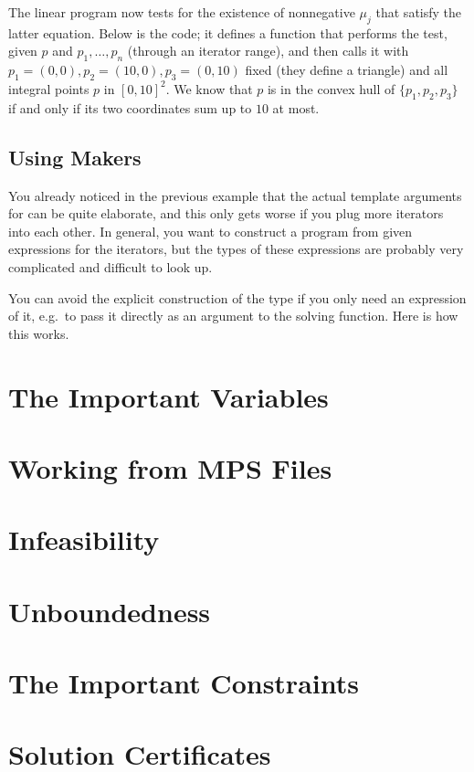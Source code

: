 The linear program now tests for the existence of nonnegative $\mu_j$
that satisfy the latter equation. Below is the code; it defines a function
that performs the test, given $p$ and $p_1,\ldots,p_n$ (through an iterator
range), and then calls it with $p_1=(0,0), p_2=(10,0), p_3=(0,10)$ fixed 
(they define a triangle) and all integral points $p$ in $[0,10]^2$. We know
that $p$ is in the convex hull of $\{p_1,p_2,p_3\}$ if and only if its two
coordinates sum up to $10$ at most.


\subsection{Using Makers}
You already noticed in the previous example that the actual 
template arguments for 
can be quite elaborate, and this only gets worse if you plug more 
iterators into each other. In general, you want to construct a 
program from given expressions for the iterators, but the
types of these expressions are probably very complicated and 
difficult to look up. 

You can avoid the explicit construction of the type
if you only need an expression of it, e.g.\ to pass it directly 
as an argument to the solving function. Here is how this works.


\section{The Important Variables}

\section{Working from MPS Files}

\section{Infeasibility}\label{sec:QP-infeasible}

\section{Unboundedness}\label{sec:QP-unbounded}


\section{The Important Constraints}

\section{Solution Certificates}



